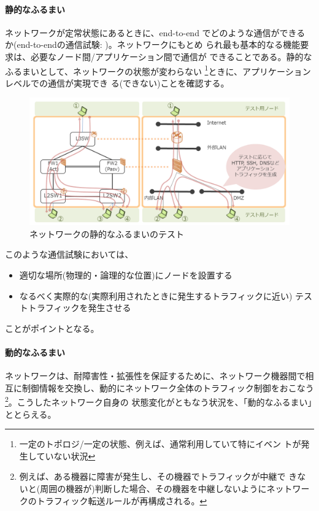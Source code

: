     \paragraph{静的なふるまい}
ネットワークが定常状態にあるときに、end-to-end でどのような通信ができる
か(end-to-endの通信試験: )。ネットワークにもとめ
られ最も基本的なる機能要求は、必要なノード間/アプリケーション間で通信が
できることである。静的なふるまいとして、ネットワークの状態が変わらない
\footnote{一定のトポロジ/一定の状態、例えば、通常利用していて特にイベン
トが発生していない状況}ときに、アプリケーションレベルでの通信が実現でき
る(できない)ことを確認する。
\begin{figure}[h]
 \centering
 \includegraphics[scale=0.5]{img/test-static.png}
 \caption{ネットワークの静的なふるまいのテスト}
 \label{fig:test-static}
\end{figure}

このような通信試験においては、
\begin{itemize}
 \item 適切な場所(物理的・論理的な位置)にノードを設置する
 \item なるべく実際的な(実際利用されたときに発生するトラフィックに近い)
       テストトラフィックを発生させる
\end{itemize}
ことがポイントとなる。

    \paragraph{動的なふるまい}
ネットワークは、耐障害性・拡張性を保証するために、ネットワーク機器間で相
互に制御情報を交換し、動的にネットワーク全体のトラフィック制御をおこなう
\footnote{例えば、ある機器に障害が発生し、その機器でトラフィックが中継で
きないと(周囲の機器が)判断した場合、その機器を中継しないようにネットワー
クのトラフィック転送ルールが再構成される。}。こうしたネットワーク自身の
状態変化がともなう状況を、「動的なふるまい」ととらえる。

